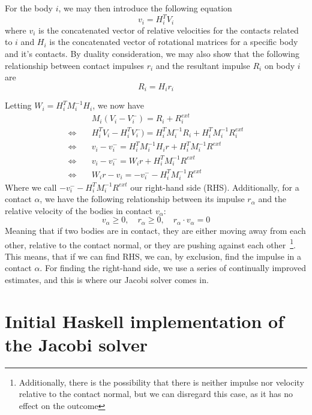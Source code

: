 \documentclass[runningheads,a4paper]{llncs}
\begin{document}
For the body $i$, we may then introduce the following equation
\begin{equation}
  v_i = H_i^TV_i
\end{equation}
where $v_i$ is the concatenated vector of relative velocities for the contacts
related to $i$ and $H_i$ is the concatenated vector of rotational matrices for a
specific body and it's contacts. By duality consideration, we may also show that
the following relationship between contact impulses $r_i$ and the resultant
impulse $R_i$ on body $i$ are
\begin{equation}
R_i = H_i r_i
\end{equation}

Letting $W_i = H_i^TM_i^{-1}H_i$, we now have
\begin{align}
  & M_i(V_i - V_i^-) = R_i + R_i^{ext} \\
  \Leftrightarrow \quad & H_i^T V_i - H_i^T V_i^-) = H_i^TM_i^{-1} R_i + H_i^T
  M_i^{-1} R_i^{ext}
  \\
  \Leftrightarrow \quad & v_i - v_i^{-} = H_i^T M_i^{-1}H_i r + H_i^T M_i^{-1} R^{ext} \\
  \Leftrightarrow \quad & v_i - v_i^{-} = W_i r + H_i^T M_i^{-1} R^{ext} \\
  \Leftrightarrow \quad & W_i r - v_i = -v_i^{-} - H_i^T M_i^{-1} R^{ext}
\end{align}
Where we call $-v_i^{-} - H_i^T M_i^{-1} R^{ext}$ our right-hand side (RHS).
Additionally, for a contact $\alpha$, we have the following relationship between
its impulse $r_\alpha$ and the relative velocity of the bodies in contact
$v_\alpha$:
\begin{equation}\label{impulseXvectorConstraint}
  v_\alpha \geq 0, \quad r_\alpha \geq 0, \quad r_\alpha \cdot v_\alpha = 0
\end{equation}
Meaning that if two bodies are in contact, they are either moving away from
each other, relative to the contact normal, or they are pushing against each
other~\footnote{Additionally, there is the possibility that there is neither
  impulse nor velocity relative to the contact normal, but we can disregard
  this case, as it has no effect on the outcome}. This means, that if we can
find RHS, we can, by exclusion, find the impulse in a contact $\alpha$. For
finding the right-hand side, we use a series of continually improved estimates,
and this is where our Jacobi solver comes in.

\section{Initial Haskell implementation of the Jacobi solver}
\end{document}
